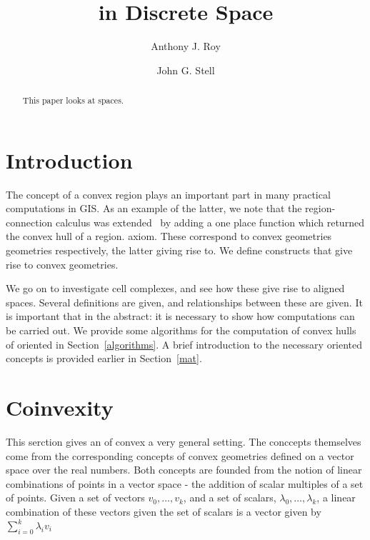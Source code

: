 \documentclass[11pt,a4paper]{llncs}
\newcounter{ax}
\newcommand{\keywords}[1]{\noindent{\small\textbf{Key Words:} #1}}
\begin{document}
  \title{ in Discrete Space}
  \author{Anthony J. Roy \and John G. Stell}

\maketitle

\begin{abstract}
This paper looks at spaces. 
\end{abstract}

\keywords{Simple things heere.}

\pagebreak

\section{Introduction}%

The concept of a convex region plays an important part in many
practical computations in GIS. As an example of the
latter, we note that the region-connection calculus was
extended~\cite[p287]{CohnGeoInf1997} by adding a one place
function which returned the convex hull of a region.
axiom. These correspond to convex geometries  geometries
respectively, the latter giving rise to. We
define constructs that give rise to convex
geometries.

We go on to investigate cell complexes, and see how these give
rise to aligned spaces. Several definitions are
given, and relationships between these are given. It is
important that  in the abstract: it
is necessary to show how computations can be carried out. We
provide some algorithms for the computation of convex hulls of
oriented in Section~\ref{algorithms}. A brief introduction
to the necessary oriented  concepts is provided earlier in
Section~\ref{mat}.
\section{Coinvexity} %

This serction gives an  of convex a very general setting. The conccepts themselves come from the corresponding concepts of convex geometries defined on a vector space over the real numbers. Both concepts are founded from the notion of linear combinations of points in a vector space - the addition of scalar multiples of a set of points. Given a set of vectors $\mathit{v}_{0}, \ldots, \mathit{v}_{k}$, and a set of scalars, $\lambda_{0}, \ldots, \lambda_{k}$, a linear combination of these vectors given the set of scalars is a vector given by $\sum^{k}_{i=0}\lambda_{i}\mathit{v}_{i}$
\end{document}
